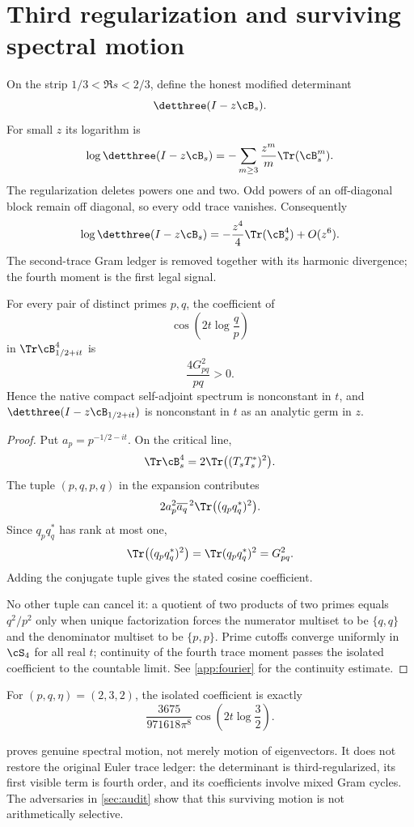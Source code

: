 \section{Third regularization and surviving spectral motion}
\label{sec:regularized}

On the strip $1/3<\Re s<2/3$, define the honest modified determinant
\[
 \detthree(I-z\cB_s).
\]
For small $z$ its logarithm is
\[
 \log\detthree(I-z\cB_s)
 =-\sum_{m\ge3}\frac{z^m}{m}\Tr(\cB_s^m).
\]
The regularization deletes powers one and two.  Odd powers of an
off-diagonal block remain off diagonal, so every odd trace vanishes.
Consequently
\[
 \log\detthree(I-z\cB_s)
 =-\frac{z^4}{4}\Tr(\cB_s^4)+O(z^6).
\]
The second-trace Gram ledger is removed together with its harmonic
divergence; the fourth moment is the first legal signal.

\begin{theorem}
\label{thm:fourth}
For every pair of distinct primes $p,q$, the coefficient of
\[
 \cos\left(2t\log\frac qp\right)
\]
in $\Tr\cB_{1/2+it}^4$ is
\[
 \frac{4G_{pq}^2}{pq}>0.
\]
Hence the native compact self-adjoint spectrum is nonconstant in $t$,
and $\detthree(I-z\cB_{1/2+it})$ is nonconstant in $t$ as an analytic
germ in $z$.
\end{theorem}

\begin{proof}
Put $a_p=p^{-1/2-it}$.  On the critical line,
\[
 \Tr\cB_s^4=2\Tr\bigl((T_sT_s^*)^2\bigr).
\]
The tuple $(p,q,p,q)$ in the expansion contributes
\[
 2a_p^2\overline{a_q}^{\,2}
 \Tr\bigl((q_pq_q^*)^2\bigr).
\]
Since $q_pq_q^*$ has rank at most one,
\[
 \Tr\bigl((q_pq_q^*)^2\bigr)
 =\Tr(q_pq_q^*)^2=G_{pq}^2.
\]
Adding the conjugate tuple gives the stated cosine coefficient.

No other tuple can cancel it: a quotient of two products of two primes
equals $q^2/p^2$ only when unique factorization forces the numerator
multiset to be $\{q,q\}$ and the denominator multiset to be
$\{p,p\}$.  Prime cutoffs converge uniformly in $\cS_4$ for all
real $t$; continuity of the fourth trace moment passes the isolated
coefficient to the countable limit.  See \cref{app:fourier} for the
continuity estimate.
\end{proof}

For $(p,q,\eta)=(2,3,2)$, the isolated coefficient is exactly
\[
 \frac{3675}{971618\pi^8}
 \cos\left(2t\log\frac32\right).
\]

\begin{remark}
 proves genuine spectral motion, not merely motion of
eigenvectors.  It does not restore the original Euler trace ledger:
the determinant is third-regularized, its first visible term is
fourth order, and its coefficients involve mixed Gram cycles.  The
adversaries in \cref{sec:audit} show that this surviving motion is not
arithmetically selective.
\end{remark}

